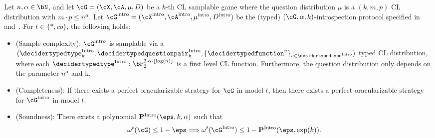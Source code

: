 \begin{theorem} \label{thm:Introspectgame}
	Let $n, \alpha \in \bN$, and let $\cG = (\cX, \cA, \mu, D)$ be a $k$-th CL samplable game where the question distribution $\mu$ is a $(k,m,p)$ CL distribution with $m \cdot p \leq n^{\alpha}$. Let $\cG^{\text{intro}} = (\cX^{\text{intro}}, \cA^{\text{intro}}, \mu^{\text{intro}}, D^{\text{intro}})$ be the (typed) $(\cG,\alpha, k)$-introspection protocol specified in~ and~. For $t \in \{*, co\}$, the following holds:
	\begin{itemize}
		\item (Sample complexity): $\cG^{\text{intro}}$ is samplable via a $(\decidertypedtype^{\text{Intro}}_k, \decidertypedquestionpair^{\text{Intro}}_k, \{\decidertypedfunction^{v}\}_{v \in \decidertypedtype^{\text{Intro}}} )$ typed CL distribution, where each $\decidertypedtype^{\text{Intro}}: \bF_2^{2 \cdot \alpha \cdot \lfloor \log(n) \rfloor}$ is a first level CL function. Furthermore, the question distribution only depends on the parameter $n^{\alpha}$ and k.
		\item (Completeness): If there exists a perfect oracularizable strategy for $\cG$ in model $t$, then there exists a perfect oracularizable strategy for $\cG^{\text{intro}}$ in model $t$. 
		\item (Soundness): There exists a polynomial $\mathbf{P}^{\text{Intro}} (\eps, k, \alpha)$ such that
		\begin{equation*}
			 \omega^t(\cG) \leq 1- \eps \Longrightarrow 	\omega^t(\cG^{\text{Intro}}) \leq 1 - \mathbf{P}^{\text{Intro}}(\eps, \exp(k)). 
		\end{equation*}
	\end{itemize}
\end{theorem}
